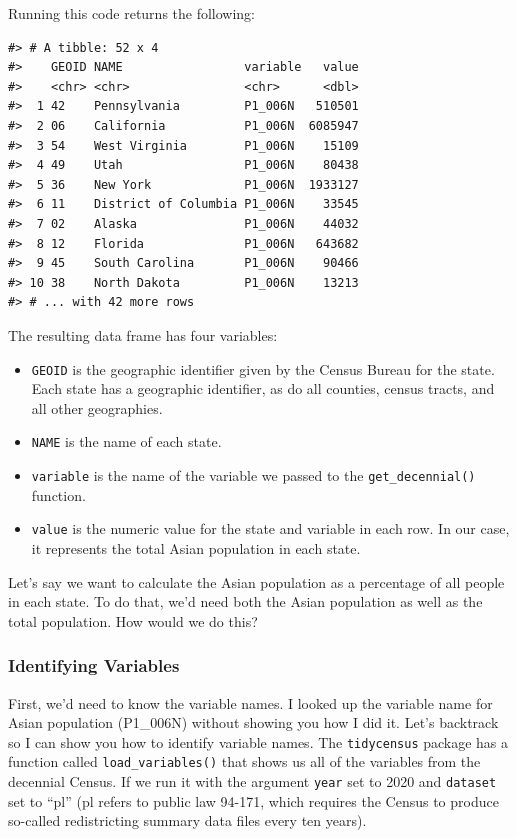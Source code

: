 \documentclass[
]{book}
\providecommand{\tightlist}{%
  \setlength{\itemsep}{0pt}\setlength{\parskip}{0pt}}
\begin{document}
Running this code returns the following:

\begin{verbatim}
#> # A tibble: 52 x 4
#>    GEOID NAME                 variable   value
#>    <chr> <chr>                <chr>      <dbl>
#>  1 42    Pennsylvania         P1_006N   510501
#>  2 06    California           P1_006N  6085947
#>  3 54    West Virginia        P1_006N    15109
#>  4 49    Utah                 P1_006N    80438
#>  5 36    New York             P1_006N  1933127
#>  6 11    District of Columbia P1_006N    33545
#>  7 02    Alaska               P1_006N    44032
#>  8 12    Florida              P1_006N   643682
#>  9 45    South Carolina       P1_006N    90466
#> 10 38    North Dakota         P1_006N    13213
#> # ... with 42 more rows
\end{verbatim}

The resulting data frame has four variables:

\begin{itemize}
\tightlist
\item
  \texttt{GEOID} is the geographic identifier given by the Census Bureau for the state. Each state has a geographic identifier, as do all counties, census tracts, and all other geographies.
\item
  \texttt{NAME} is the name of each state.
\item
  \texttt{variable} is the name of the variable we passed to the \texttt{get\_decennial()} function.
\item
  \texttt{value} is the numeric value for the state and variable in each row. In our case, it represents the total Asian population in each state.
\end{itemize}

Let's say we want to calculate the Asian population as a percentage of all people in each state. To do that, we'd need both the Asian population as well as the total population. How would we do this?

\hypertarget{identifying-variables}{%
\subsubsection*{Identifying Variables}\label{identifying-variables}}

First, we'd need to know the variable names. I looked up the variable name for Asian population (P1\_006N) without showing you how I did it. Let's backtrack so I can show you how to identify variable names. The \texttt{tidycensus} package has a function called \texttt{load\_variables()} that shows us all of the variables from the decennial Census. If we run it with the argument \texttt{year} set to 2020 and \texttt{dataset} set to ``pl'' (pl refers to public law 94-171, which requires the Census to produce so-called redistricting summary data files every ten years).
\end{document}
